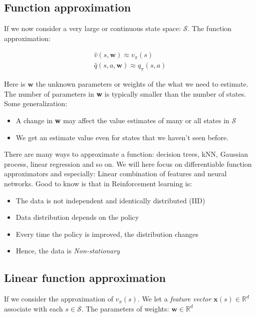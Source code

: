 \subsection{Function approximation}
If we now consider a very large or continuous state space: $\mathcal{S}$. The function approximation:

	\begin{equation}
	\begin{aligned}
		\hat{v} (s, \textbf{w}) \approx v_\pi(s) \\
		\hat{q} (s,a,\textbf{w}) \approx q_\pi(s,a)
	\end{aligned}
	\end{equation}

Here is $\textbf{w}$ the unknown parameters or weights of the what we need to estimate. The number of parameters in \textbf{w} is typically smaller than the number of states. Some generalization:
	\begin{itemize}
		\item A change in \textbf{w} may affect the value estimates of many or all states in $\mathcal{S}$
		\item We get an estimate value even for states that we haven't seen before.
	\end{itemize}

There are many ways to approximate a function: decision trees, kNN, Gaussian process, linear regression and so on. We will here focus on differentiable function approximators and especially: Linear combination of features and neural networks. Good to know is that in Reinforcement learning is:

	\begin{itemize}
		\item The data is not independent and identically distributed (IID)
		\item Data distribution depends on the policy
		\item Every time the policy is improved, the distribution changes
		\item Hence, the data is \emph{Non-stationary}
	\end{itemize}

\subsection{Linear function approximation}
If we consider the approximation of $v_\pi(s)$. We let a \emph{feature vector} $\textbf{x}(s) \in \mathbb{R}^{d}$  associate with each $s \in \mathcal{S}$. The parameters of weights: $\textbf{w} \in \mathbb{R}^{d}$

